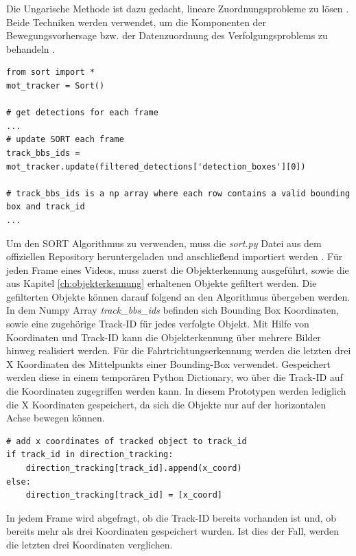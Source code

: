 Die Ungarische Methode ist dazu gedacht, lineare Zuordnungsprobleme zu lösen \cite{hungarian_method}. Beide Techniken werden verwendet, um die Komponenten der Bewegungsvorhersage bzw. der Datenzuordnung des Verfolgungsproblems zu behandeln \cite{DBLP:journals/corr/BewleyGORU16}.

\vspace*{5mm}
\begin{lstlisting}[caption={Verwendung des SORT Algorithmus}, label={lst:sort}]
from sort import *
mot_tracker = Sort()

# get detections for each frame
...
# update SORT each frame
track_bbs_ids = mot_tracker.update(filtered_detections['detection_boxes'][0])

# track_bbs_ids is a np array where each row contains a valid bounding box and track_id
...
\end{lstlisting}

Um den \ac{SORT} Algorithmus zu verwenden, muss die \emph{sort.py} Datei aus dem offiziellen Repository heruntergeladen und anschließend importiert werden \cite{sort_gh}. Für jeden Frame eines Videos, muss zuerst die Objekterkennung ausgeführt, sowie die aus Kapitel \ref{ch:objekterkennung} erhaltenen Objekte gefiltert werden. Die gefilterten Objekte können darauf folgend an den Algorithmus übergeben werden. In dem \gls{Numpy} Array \emph{track\_bbs\_ids} befinden sich Bounding Box Koordinaten, sowie eine zugehörige Track-ID für jedes verfolgte Objekt. Mit Hilfe von Koordinaten und Track-ID kann die Objekterkennung über mehrere Bilder hinweg realisiert werden. Für die Fahrtrichtungserkennung werden die letzten drei X Koordinaten des Mittelpunkts einer Bounding-Box verwendet. Gespeichert werden diese in einem temporären Python Dictionary, wo über die Track-ID auf die Koordinaten zugegriffen werden kann. In diesem Prototypen werden lediglich die X Koordinaten gespeichert, da sich die Objekte nur auf der horizontalen Achse bewegen können.

\vspace*{5mm}
\begin{lstlisting}[caption={Temporäres Speichern der X Koordinaten eines verfolgten Objekts}, label={lst:tempsave}]
# add x coordinates of tracked object to track_id
if track_id in direction_tracking:
    direction_tracking[track_id].append(x_coord)
else:
    direction_tracking[track_id] = [x_coord]
\end{lstlisting}

In jedem Frame wird abgefragt, ob die Track-ID bereits vorhanden ist und, ob bereits mehr als drei Koordinaten gespeichert wurden. Ist dies der Fall, werden die letzten drei Koordinaten verglichen. 

